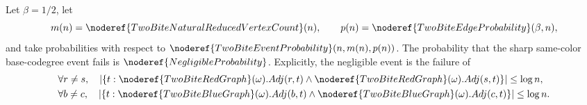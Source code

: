 \begin{helper}[FiberAndDegreeSameColorBaseCodegreeSharpFailureNegligible]
\label{helper:FiberAndDegreeSameColorBaseCodegreeSharpFailureNegligible}
Let \(\beta=1/2\), let
\[
m(n)=\noderef{TwoBiteNaturalReducedVertexCount}(n),
\qquad
p(n)=\noderef{TwoBiteEdgeProbability}(\beta,n),
\]
and take probabilities with respect to
\(\noderef{TwoBiteEventProbability}(n,m(n),p(n))\).  The probability that
the sharp same-color base-codegree event fails is
\(\noderef{NegligibleProbability}\).  Explicitly, the negligible event is the
failure of
\[
\begin{aligned}
&\forall r\ne s,\quad
|\{t:\noderef{TwoBiteRedGraph}(\omega).Adj(r,t)\land
\noderef{TwoBiteRedGraph}(\omega).Adj(s,t)\}|\le \log n,\\
&\forall b\ne c,\quad
|\{t:\noderef{TwoBiteBlueGraph}(\omega).Adj(b,t)\land
\noderef{TwoBiteBlueGraph}(\omega).Adj(c,t)\}|\le \log n .
\end{aligned}
\]
\end{helper}

